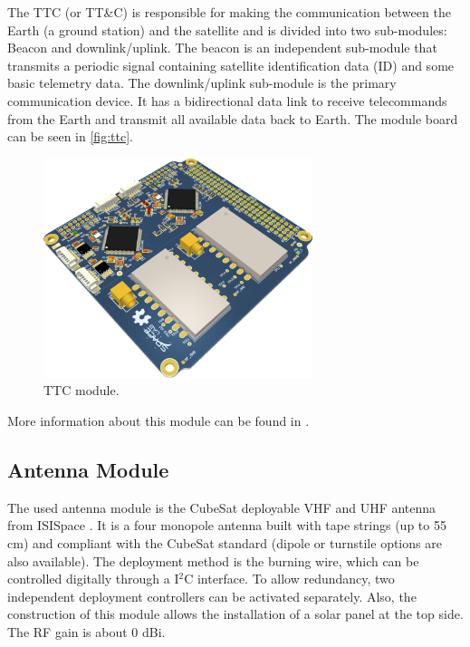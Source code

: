 The TTC (or TT\&C) is responsible for making the communication between the Earth (a ground station) and the satellite and is divided into two sub-modules: Beacon and downlink/uplink. The beacon is an independent sub-module that transmits a periodic signal containing satellite identification data (ID) and some basic telemetry data. The downlink/uplink sub-module is the primary communication device. It has a bidirectional data link to receive telecommands from the Earth and transmit all available data back to Earth. The module board can be seen in \autoref{fig:ttc}.

\begin{figure}[!ht]
    \begin{center}
        \includegraphics[width=0.7\textwidth]{figures/ttc2_pcb_3d}
        \caption{TTC module.}
        \label{fig:ttc}
    \end{center}
\end{figure}

More information about this module can be found in \cite{ttc}.

\subsection{Antenna Module}

The used antenna module is the CubeSat deployable VHF and UHF antenna from ISISpace \cite{isis-antenna}. It is a four monopole antenna built with tape strings (up to 55 cm) and compliant with the CubeSat standard (dipole or turnstile options are also available). The deployment method is the burning wire, which can be controlled digitally through a I$^{2}$C interface. To allow redundancy, two independent deployment controllers can be activated separately. Also, the construction of this module allows the installation of a solar panel at the top side. The RF gain is about 0 dBi.

